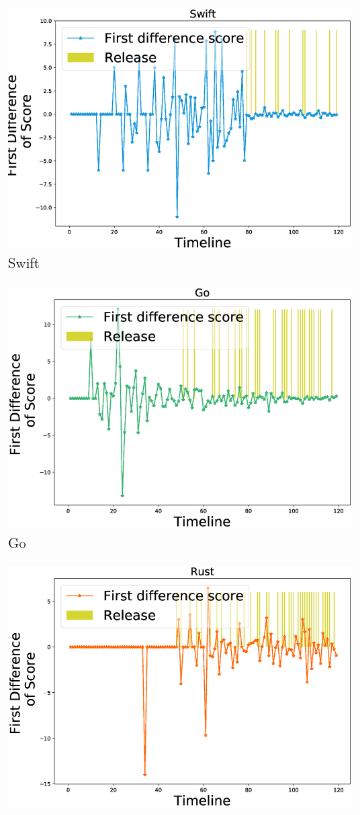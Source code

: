 \begin{figure}[htbp]
\begin{subfigure}{0.6\textwidth}
\centering
\includegraphics[scale=0.25]{figures/Swift_First_difference_release.eps}
\caption{Swift}
\label{fig:Go_FDR}
\end{subfigure}
\begin{subfigure}{0.6\textwidth}
\centering
\includegraphics[scale=0.25]{figures/Go_First_difference_release.eps}
\caption{Go}
\label{fig:Swift_FDR}
\end{subfigure}
\begin{subfigure}{0.6\textwidth}
\centering
\includegraphics[scale=0.25]{figures/Rust_First_difference_release.eps}

\end{subfigure}
\end{figure}
